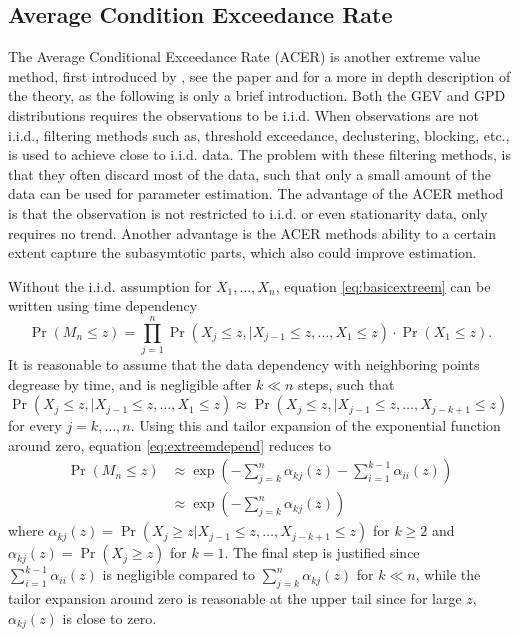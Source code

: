 \subsection{Average Condition Exceedance Rate}
The Average Conditional Exceedance Rate (ACER) is another extreme value method, first introduced by \cite{arvid0}, see the paper and \cite{arvid} for a more in depth description of the theory, as the following is only a brief introduction. 
Both the GEV and GPD distributions requires the observations to be i.i.d. When observations are not i.i.d., filtering methods such as, threshold exceedance, declustering, blocking, etc., is used to achieve close to i.i.d. data. The problem with these filtering methods, is that they often discard most of the data, such that only a small amount of the data can be used for parameter estimation. The advantage of the ACER method is that the observation is not restricted to i.i.d. or even stationarity data, only requires no trend. Another advantage is the ACER methods ability to a certain extent capture the subasymtotic parts, which also could improve estimation.

Without the i.i.d. assumption for $X_1,\dots,X_n$, equation \eqref{eq:basicextreem} can be written using time dependency
\begin{equation}
\label{eq:extreemdepend}
\Pr(M_n \leq z)=\prod_{j=1}^{n} \Pr(X_j \leq z,| X_{j-1} \leq z,\dots, X_1 \leq z)\cdot \Pr(X_1 \leq z).
\end{equation}
It is reasonable to assume that the data dependency with neighboring points degrease by time, and is negligible after $k \ll n$ steps, such that \\${\Pr(X_j \leq z,| X_{j-1} \leq z,\dots, X_1 \leq z) \approx \Pr(X_j \leq z,| X_{j-1} \leq z,\dots, X_{j-k+1} \leq z) }$ for every $j=k,\dots, n$. Using this and tailor expansion of the exponential function around zero, equation \eqref{eq:extreemdepend} reduces to
\begin{align}
\Pr(M_n \leq z)&\approx \exp\left( -\sum_{j=k}^{n} \alpha_{kj}(z) -\sum_{i=1}^{k-1} \alpha_{ii}(z) \right) \nonumber\\
			&\approx \exp\left( -\sum_{j=k}^{n} \alpha_{kj}(z) \right)
\end{align}
where $\alpha_{kj}(z)=\Pr(X_j \geq z |X_{j-1} \leq z, \dots, X_{j-k+1}\leq z)$ for $k\geq 2$ and $\alpha_{kj}(z)=\Pr(X_j \geq z)$ for $k=1$. The final step is justified since $\sum_{i=1}^{k-1} \alpha_{ii}(z)$ is negligible compared to $\sum_{j=k}^{n} \alpha_{kj}(z)$ for $k \ll n$, while the tailor expansion around zero is reasonable at the upper tail since for large $z$, $\alpha_{kj}(z)$ is close to zero.

